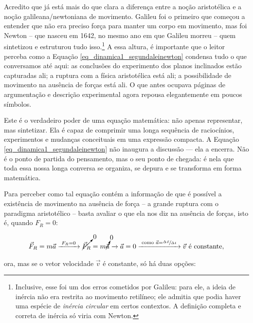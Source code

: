 Acredito que já está mais do que clara a diferença entre a noção aristotélica e a noção galileana/newtoniana de movimento. Galileu foi o primeiro que começou a entender que não era preciso força para manter um corpo em movimento, mas foi Newton -- que nasceu em 1642, no mesmo ano em que Galileu morreu -- quem sintetizou e estruturou tudo isso.\footnote{ Inclusive, esse foi um dos erros cometidos por Galileu: para ele, a ideia de inércia não era restrita ao movimento retilíneo; ele admitia que podia haver uma espécie de \emph{inércia circular} em certos contextos. A definição completa e correta de inércia só viria com Newton.} A essa altura, é importante que o leitor perceba como a Equação \eqref{eq_dinamica1_segundaleinewton} condensa tudo o que conversamos até aqui: as conclusões do experimento dos planos inclinados estão capturadas ali; a ruptura com a física aristotélica está ali; a possibilidade de movimento na ausência de forças está ali. O que antes ocupava páginas de argumentação e descrição experimental agora repousa elegantemente em poucos símbolos.

Este é o verdadeiro poder de uma equação matemática: não apenas representar, mas sintetizar. Ela é capaz de comprimir uma longa sequência de raciocínios, experimentos e mudanças conceituais em uma expressão compacta. A Equação \eqref{eq_dinamica1_segundaleinewton} não inaugura a discussão — ela a encerra. Não é o ponto de partida do pensamento, mas o seu ponto de chegada: é nela que toda essa nossa longa conversa se organiza, se depura e se transforma em forma matemática.

Para perceber como tal equação contém a informação de que é possível a existência de movimento na ausência de força -- a grande ruptura com o paradigma aristotélico -- basta avaliar o que ela nos diz na ausência de forças, isto é, quando $F_R=0$:

$$ \vec F_R = m \vec a \xrightarrow{ \text{ } F_R = 0 \text{ } } \cancelto{0}{  \vec F_R }= m \cancelto{0}{  \vec a }  \xrightarrow{\text{  }} \vec a  =  0 \xrightarrow{ \text{ como } \vec a = \sfrac{\Delta \vec v}{\Delta t} \text{ }} \vec v \text{ é constante},  $$

\noindent ora, mas se o vetor velocidade $\vec v$ é constante, só há duas opções:

